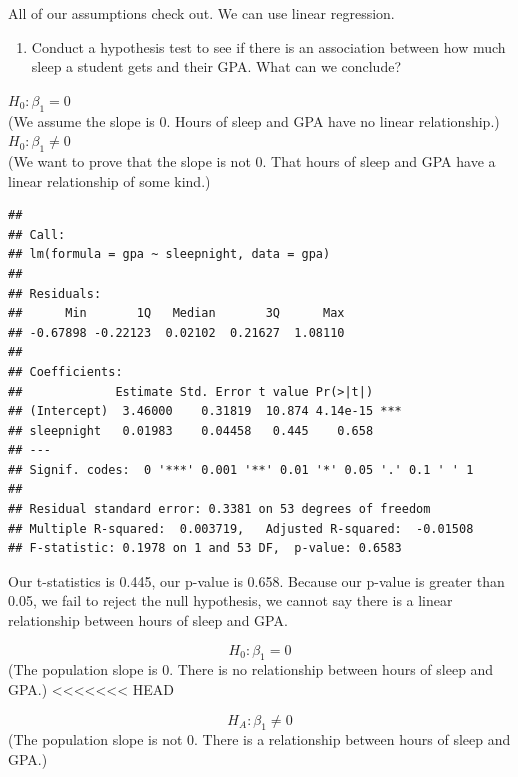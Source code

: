 \documentclass[]{article}
\newenvironment{Shaded}{\begin{snugshade}}{\end{snugshade}}
\newcommand{\KeywordTok}[1]{\textcolor[rgb]{0.13,0.29,0.53}{\textbf{#1}}}
\newcommand{\NormalTok}[1]{#1}
\newcommand{\OperatorTok}[1]{\textcolor[rgb]{0.81,0.36,0.00}{\textbf{#1}}}
\newcommand{\StringTok}[1]{\textcolor[rgb]{0.31,0.60,0.02}{#1}}
\providecommand{\tightlist}{%
  \setlength{\itemsep}{0pt}\setlength{\parskip}{0pt}}
\begin{document}
All of our assumptions check out. We can use linear regression.

\newpage

\begin{enumerate}
\def\labelenumi{\arabic{enumi}.}
\setcounter{enumi}{7}
\tightlist
\item
  Conduct a hypothesis test to see if there is an association between
  how much sleep a student gets and their GPA. What can we conclude?
\end{enumerate}

\(H_0: \beta_1 = 0\)\\
(We assume the slope is 0. Hours of sleep and GPA have no linear
relationship.)\\
\(H_0: \beta_1\ne0\)\\
(We want to prove that the slope is not 0. That hours of sleep and GPA
have a linear relationship of some kind.)

\begin{Shaded}
\end{Shaded}

\begin{verbatim}
## 
## Call:
## lm(formula = gpa ~ sleepnight, data = gpa)
## 
## Residuals:
##      Min       1Q   Median       3Q      Max 
## -0.67898 -0.22123  0.02102  0.21627  1.08110 
## 
## Coefficients:
##             Estimate Std. Error t value Pr(>|t|)    
## (Intercept)  3.46000    0.31819  10.874 4.14e-15 ***
## sleepnight   0.01983    0.04458   0.445    0.658    
## ---
## Signif. codes:  0 '***' 0.001 '**' 0.01 '*' 0.05 '.' 0.1 ' ' 1
## 
## Residual standard error: 0.3381 on 53 degrees of freedom
## Multiple R-squared:  0.003719,   Adjusted R-squared:  -0.01508 
## F-statistic: 0.1978 on 1 and 53 DF,  p-value: 0.6583
\end{verbatim}

Our t-statistics is 0.445, our p-value is 0.658. Because our p-value is
greater than 0.05, we fail to reject the null hypothesis, we cannot say
there is a linear relationship between hours of sleep and GPA.

\[H_0: \beta_1 = 0 \] (The population slope is 0. There is no
relationship between hours of sleep and GPA.)
<<<<<<< HEAD

\[H_A: \beta_1 \ne 0\] (The population slope is not 0. There is a
relationship between hours of sleep and GPA.)
\end{document}
